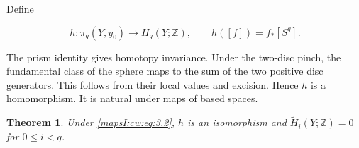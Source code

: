 \documentclass[11pt]{article}
\newtheorem{theorem}{Theorem}[section]
\begin{document}
Define

\begin{equation}
h:\pi_q(Y,y_0)\longrightarrow H_q(Y;\mathbb Z),\qquad
h([f])=f_*[S^q].
\label{mapsI:cw:eq:4.1}
\end{equation}

The prism identity gives homotopy invariance. Under the two-disc pinch, the fundamental class of the sphere maps to the sum of the two positive disc generators. This follows from their local values and excision. Hence \(h\) is a homomorphism. It is natural under maps of based spaces.

\begin{theorem}
\label{mapsI:cw:hurewicz-theorem-result}
Under \eqref{mapsI:cw:eq:3.2}, \(h\) is an isomorphism and
\(\widetilde H_i(Y;\mathbb Z)=0\) for \(0\leq i<q\).
\end{theorem}
\end{document}
